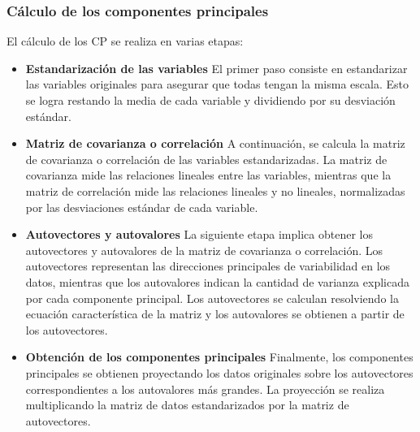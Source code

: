\documentclass{article}
\begin{document}
\subsubsection{Cálculo de los componentes principales}
El cálculo de los CP se realiza en varias etapas:
\begin{itemize}

\item \textbf{Estandarización de las variables}
El primer paso consiste en estandarizar las variables originales para asegurar que todas tengan la misma escala. Esto se logra restando la media de cada variable y dividiendo por su desviación estándar.

\item \textbf{Matriz de covarianza o correlación}
A continuación, se calcula la matriz de covarianza o correlación de las variables estandarizadas. La matriz de covarianza mide las relaciones lineales entre las variables, mientras que la matriz de correlación mide las relaciones lineales y no lineales, normalizadas por las desviaciones estándar de cada variable.

\item \textbf{Autovectores y autovalores}
La siguiente etapa implica obtener los autovectores y autovalores de la matriz de covarianza o correlación. Los autovectores representan las direcciones principales de variabilidad en los datos, mientras que los autovalores indican la cantidad de varianza explicada por cada componente principal. Los autovectores se calculan resolviendo la ecuación característica de la matriz y los autovalores se obtienen a partir de los autovectores.

\item \textbf{Obtención de los componentes principales}
Finalmente, los componentes principales se obtienen proyectando los datos originales sobre los autovectores correspondientes a los autovalores más grandes. La proyección se realiza multiplicando la matriz de datos estandarizados por la matriz de autovectores.
\end{itemize}
\end{document}
